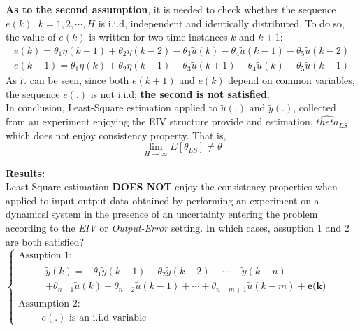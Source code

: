 \textbf{As to the second assumption}, it is needed to check whether the sequence \(e(k)\), \(k = 1,2, \cdots, H\) is i.i.d, independent and identically distributed. To do so, the value of \(e(k)\) is written for two time instances \(k\) and \(k+1\):
\[
\begin{array}{l}
e(k) = \theta_1\eta(k-1) + \theta_2\eta(k-2) - \theta_3\tilde{u}(k) - \theta_4\tilde{u}(k-1) - \theta_5\tilde{u}(k-2) \\[1ex]
e(k+1) = \theta_1\eta(k) + \theta_2\eta(k-1) - \theta_3\tilde{u}(k+1) - \theta_4\tilde{u}(k) - \theta_5\tilde{u}(k-1)
\end{array}
\]
As it can be seen, since both \(e(k+1)\) and \(e(k)\) depend on common variables, the sequence \(e(.)\) is not i.i.d; \textbf{the second is not satisfied}.\\

In conclusion, Least-Square estimation applied to \(\tilde{u}(.)\) and \(\tilde{y}(.)\), collected from an experiment enjoying the EIV structure provide and estimation, \(\hat{theta}_{LS}\) which does not enjoy consistency property. That is,
\[
\lim\limits_{H \to \infty} E[\theta_{LS}] \neq \theta
\]

\textbf{Results:}\\
Least-Square estimation \textbf{DOES NOT} enjoy the consistency properties when applied to input-output data obtained by performing an experiment on a dynamicsl system in the presence of an uncertainty entering the problem according to the \textit{EIV} or \textit{Output-Error} setting. 
\newpage
In which cases, assuption 1 and 2 are both satisfied?\vspace{0.5cm} \\
\(
\begin{cases}
\text{Assuption 1:}\\ 
\hspace{1cm}
\begin{array}{l}
\tilde{y}(k)= -\theta_1 \tilde{y}(k - 1) - \theta_2 \tilde{y}(k - 2) - \cdots -\tilde{y}(k - n) \\[1ex] + \theta_{n+1} \tilde{u}(k) + \theta_{n+2} \tilde{u}(k - 1) + \cdots + \theta_{n+m+1}\tilde{u}(k - m) + \textbf{e(k)}
\end{array}\\
\text{Assumption 2:}\\
\hspace{1cm}
e(.) \text{ is an i.i.d variable}
\end{cases}
\)\\

